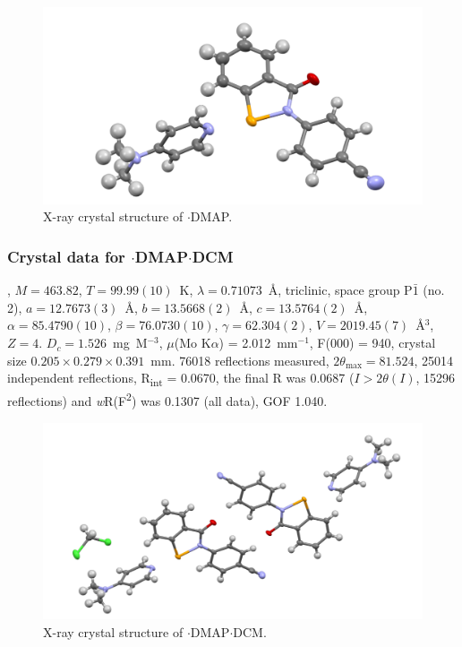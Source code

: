 \begin{refsection}
\begin{figure}
  \includegraphics[width=0.6\linewidth]{Figures/ebs-4cn-dmap-xtal.pdf}
  \caption{X-ray crystal structure of \texorpdfstring{$ \cdot $DMAP}{C21 H18 N4 O Se}.}
\end{figure}

\subsubsection{Crystal data for \texorpdfstring{$ \cdot $DMAP$ \cdot $DCM}{C21.50 H19 Cl N4 O Se}}
, $M=463.82$, $T=99.99(10)$~K, $ \lambda=0.71073 $~\AA, triclinic, space group P$\bar{1}$ (no. 2), $a = 12.7673(3)$~\AA, $b = 13.5668(2)$~\AA, $c = 13.5764(2)$~\AA, $\alpha = 85.4790(10)$\degree, $\beta = 76.0730(10)$\degree, $\gamma = 62.304(2)$\degree, $V = 2019.45(7)$~\AA$^{3}$, $Z = 4$. $D_{c}= 1.526$~mg~M$^{-3}$, $\mu$(Mo K$\alpha$) = 2.012~mm$^{-1}$, F(000) = 940, crystal size $0.205 \times 0.279 \times 0.391$~mm. 76018 reflections measured, $2\theta_{\max}=81.524$\degree, 25014 independent reflections, R\textsubscript{int} = 0.0670, the final R was 0.0687 ($I > 2\theta(I)$, 15296 reflections) and \textit{w}R(F\textsuperscript{2}) was 0.1307 (all data), GOF 1.040.

\begin{figure}
  \includegraphics[width=0.6\linewidth]{Figures/ebs-4cn-dmap-dcm-xtal.pdf}
  \caption{X-ray crystal structure of \texorpdfstring{$ \cdot $DMAP$ \cdot $DCM}{C21.50 H19 Cl N4 O Se}.}
\end{figure}


\end{refsection}
